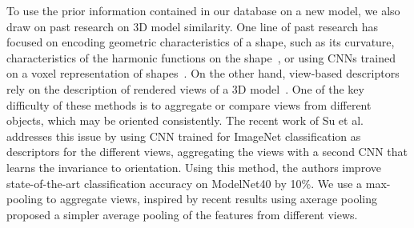 To use the prior information contained in our database on a new model, we also draw on past research on 3D model similarity.
One line of past research has focused on encoding geometric characteristics of a shape, such as its curvature, characteristics of the harmonic functions on the shape~\cite{bronstein2011shape, horn1984extended, kazhdan2003rotation}, or using CNNs trained on a voxel representation of shapes~\cite{maturana2015voxnet, wu20153d}.
On the other hand, view-based descriptors rely on the description of rendered views of a 3D model~\cite{chen2003visual, goldfeder2011data}.
One of the key difficulty of these methods is to aggregate or compare views from different objects, which may be oriented consistently.
The recent work of Su et al.~\cite{su2015multi} addresses this issue by using CNN trained for ImageNet classification as descriptors for the different views, aggregating the views with a second CNN that learns the invariance to orientation.
Using this method, the authors improve state-of-the-art classification accuracy on ModelNet40 by 10\%.
We use a max-pooling to aggregate views, inspired by recent results using axerage pooling~\cite{aubry2015understanding} proposed a simpler average pooling of the features from different views.

